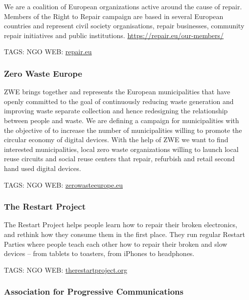 \documentclass[
]{book}
\begin{document}
We are a coalition of European organizations active around the cause of repair. Members of the Right to Repair campaign are based in several European countries and represent civil society organisations, repair businesses, community repair initiatives and public institutions. \url{https://repair.eu/our-members/}

TAGS: NGO
WEB: \href{https://repair.eu}{repair.eu}

\hypertarget{zero-waste-europe}{%
\subsubsection{Zero Waste Europe}\label{zero-waste-europe}}

ZWE brings together and represents the European municipalities that have openly committed to the goal of continuously reducing waste generation and improving waste separate collection and hence redesigning the relationship between people and waste. We are defining a campaign for municipalities with the objective of to increase the number of municipalities willing to promote the circular economy of digital devices. With the help of ZWE we want to find interested municipalities, local zero waste organizations willing to launch local reuse circuits and social reuse centers that repair, refurbish and retail second hand used digital devices.

TAGS: NGO
WEB: \href{http://www.zerowasteeurope.eu}{zerowasteeurope.eu}

\hypertarget{the-restart-project}{%
\subsubsection{The Restart Project}\label{the-restart-project}}

The Restart Project helps people learn how to repair their broken electronics, and rethink how they consume them in the first place. They run regular Restart Parties where people teach each other how to repair their broken and slow devices -- from tablets to toasters, from iPhones to headphones.

TAGS: NGO
WEB: \href{http://www.therestartproject.org}{therestartproject.org}

\hypertarget{association-for-progressive-communications}{%
\subsubsection{Association for Progressive Communications}\label{association-for-progressive-communications}}
\end{document}
